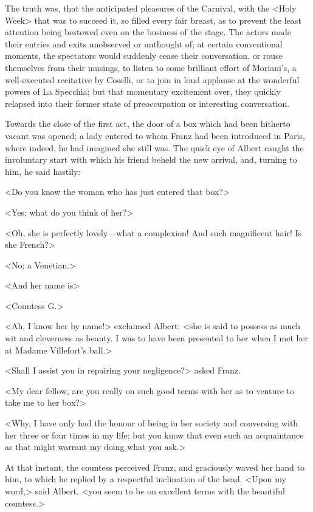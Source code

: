  The truth was, that the anticipated pleasures of the Carnival, with the <Holy Week> that was to succeed it, so filled every fair breast, as to prevent the least attention being bestowed even on the business of the stage. The actors made their entries and exits unobserved or unthought of; at certain conventional moments, the spectators would suddenly cease their conversation, or rouse themselves from their musings, to listen to some brilliant effort of Moriani's, a well-executed recitative by Coselli, or to join in loud applause at the wonderful powers of La Specchia; but that momentary excitement over, they quickly relapsed into their former state of preoccupation or interesting conversation. 

 Towards the close of the first act, the door of a box which had been hitherto vacant was opened; a lady entered to whom Franz had been introduced in Paris, where indeed, he had imagined she still was. The quick eye of Albert caught the involuntary start with which his friend beheld the new arrival, and, turning to him, he said hastily: 

 <Do you know the woman who has just entered that box?> 

 <Yes; what do you think of her?> 

 <Oh, she is perfectly lovely—what a complexion! And such magnificent hair! Is she French?> 

 <No; a Venetian.> 

 <And her name is\longdash> 

 <Countess G\doubleemdash.> 

 <Ah, I know her by name!> exclaimed Albert; <she is said to possess as much wit and cleverness as beauty. I was to have been presented to her when I met her at Madame Villefort's ball.> 

 <Shall I assist you in repairing your negligence?> asked Franz. 

 <My dear fellow, are you really on such good terms with her as to venture to take me to her box?> 

 <Why, I have only had the honour of being in her society and conversing with her three or four times in my life; but you know that even such an acquaintance as that might warrant my doing what you ask.> 

 At that instant, the countess perceived Franz, and graciously waved her hand to him, to which he replied by a respectful inclination of the head. <Upon my word,> said Albert, <you seem to be on excellent terms with the beautiful countess.> 

